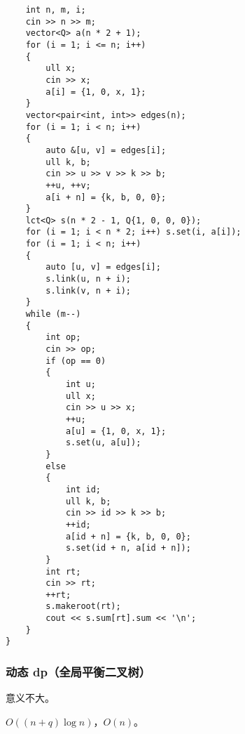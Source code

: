 \documentclass[12pt]{ctexart}
\begin{document}
\begin{lstlisting}
	int n, m, i;
	cin >> n >> m;
	vector<Q> a(n * 2 + 1);
	for (i = 1; i <= n; i++)
	{
		ull x;
		cin >> x;
		a[i] = {1, 0, x, 1};
	}
	vector<pair<int, int>> edges(n);
	for (i = 1; i < n; i++)
	{
		auto &[u, v] = edges[i];
		ull k, b;
		cin >> u >> v >> k >> b;
		++u, ++v;
		a[i + n] = {k, b, 0, 0};
	}
	lct<Q> s(n * 2 - 1, Q{1, 0, 0, 0});
	for (i = 1; i < n * 2; i++) s.set(i, a[i]);
	for (i = 1; i < n; i++)
	{
		auto [u, v] = edges[i];
		s.link(u, n + i);
		s.link(v, n + i);
	}
	while (m--)
	{
		int op;
		cin >> op;
		if (op == 0)
		{
			int u;
			ull x;
			cin >> u >> x;
			++u;
			a[u] = {1, 0, x, 1};
			s.set(u, a[u]);
		}
		else
		{
			int id;
			ull k, b;
			cin >> id >> k >> b;
			++id;
			a[id + n] = {k, b, 0, 0};
			s.set(id + n, a[id + n]);
		}
		int rt;
		cin >> rt;
		++rt;
		s.makeroot(rt);
		cout << s.sum[rt].sum << '\n';
	}
}
\end{lstlisting}

\subsubsection{动态 dp（全局平衡二叉树）}

意义不大。

$O((n+q)\log n)$，$O(n)$。
\end{document}
